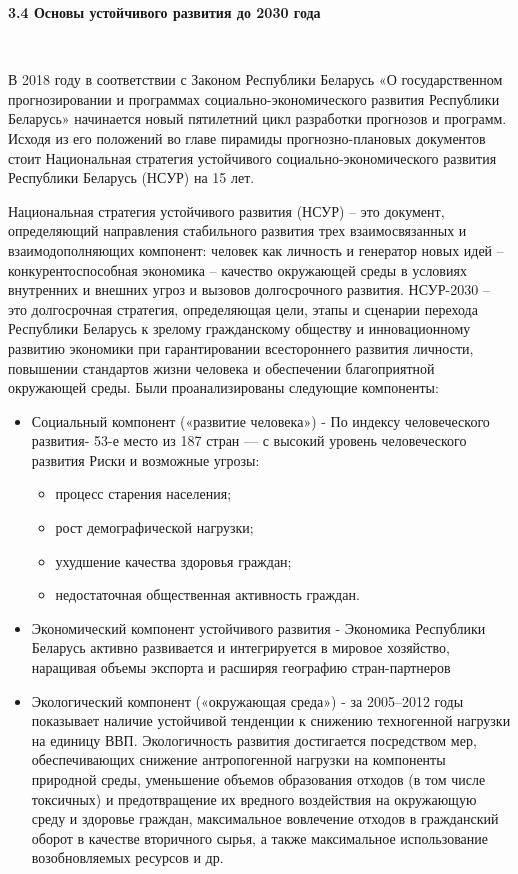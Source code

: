 \documentclass[14pt,a4paper]{article}
\begin{document}
    \begin{center}
        \textbf{3.4 Основы устойчивого развития до 2030 года}
    \end{center}
    \\
    \par
    В 2018 году в соответствии с Законом Республики Беларусь «О государственном прогнозировании и программах социально-экономического развития Республики Беларусь» начинается новый пятилетний цикл разработки прогнозов и программ. Исходя из его положений во
    главе пирамиды прогнозно-плановых документов стоит Национальная стратегия устойчивого
    социально-экономического развития Республики Беларусь (НСУР) на 15 лет.
    \par
    Национальная стратегия устойчивого развития (НСУР) – это документ, определяющий направления стабильного развития трех взаимосвязанных и взаимодополняющих компонент: человек как личность и генератор новых идей – конкурентоспособная экономика – качество окружающей среды в условиях внутренних и внешних угроз и вызовов долгосрочного развития.
    НСУР-2030 – это долгосрочная стратегия, определяющая цели, этапы и сценарии перехода Республики Беларусь к зрелому гражданскому обществу и инновационному развитию экономики при гарантировании всестороннего развития личности, повышении стандартов жизни человека и обеспечении благоприятной окружающей среды.
    Были проанализированы следующие компоненты:
    \begin{itemize}
        \item Социальный компонент («развитие человека»)
        - По индексу человеческого развития- 53-е место из 187 стран --- с высокий уровень человеческого развития
        Риски и возможные угрозы:
        \begin{itemize}
            \item процесс старения населения;
            \item рост демографической нагрузки;
            \item ухудшение качества здоровья граждан;
            \item недостаточная общественная активность граждан.
        \end{itemize}
        \item Экономический компонент устойчивого развития
        - Экономика Республики Беларусь активно развивается и интегрируется в мировое хозяйство, наращивая объемы экспорта и расширяя географию стран-партнеров
        \item Экологический компонент («окружающая среда»)
        - за 2005–2012 годы показывает наличие устойчивой тенденции к снижению техногенной нагрузки на единицу ВВП.
        Экологичность развития достигается посредством мер, обеспечивающих снижение антропогенной нагрузки на компоненты природной среды, уменьшение объемов образования отходов (в том числе токсичных) и предотвращение их вредного воздействия на окружающую среду и здоровье граждан, максимальное вовлечение отходов в гражданский оборот в качестве вторичного сырья, а также максимальное использование возобновляемых ресурсов и др.
    \end{itemize}
\end{document}
